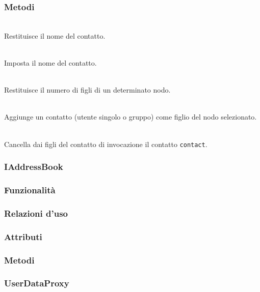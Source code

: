 \subsubsection*{Metodi}
\begin{description}
  \item{}\\
Restituisce il nome del contatto.
  \item{}\\
Imposta il nome del contatto.
  \item{}\\
Restituisce il numero di figli di un determinato nodo.
  \item{}\\
Aggiunge un contatto (utente singolo o gruppo) come figlio del nodo selezionato.
  \item{}\\
Cancella dai figli del contatto di invocazione il contatto \texttt{contact}.
\end{description}

\subsubsection{IAddressBook}\label{sec:iaddressbook}

\subsubsection*{Funzionalità}

\subsubsection*{Relazioni d'uso}

\subsubsection*{Attributi}

\subsubsection*{Metodi}

\subsubsection{UserDataProxy}\label{sec:userdataproxy}

